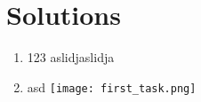 \documentclass{article}
\begin{document}

\section*{Solutions}
\begin{enumerate}
        \item 123 \makebox[0pt][l]{}
 aslidjaslidja
        \item asd \makebox[0pt][l]{}
        \texttt{[image: first\_task.png]}
\end{enumerate}
\end{document}
